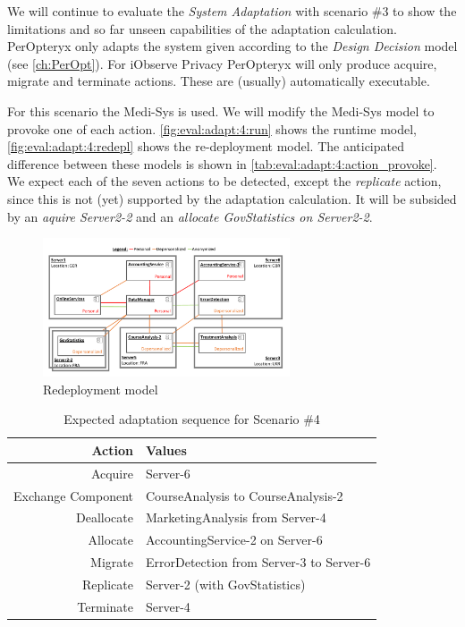 We will continue to evaluate the \textit{System Adaptation} with scenario \#3 to show the limitations and so far unseen capabilities of the adaptation calculation. PerOpteryx only adapts the system given according to the \textit{Design Decision} model (see \autoref{ch:PerOpt}). For iObserve Privacy PerOpteryx will only produce acquire, migrate and terminate actions. These are (usually) automatically executable.

For this scenario the Medi-Sys is used. We will modify the Medi-Sys model to provoke one of each action. \autoref{fig:eval:adapt:4:run} shows the runtime model, \autoref{fig:eval:adapt:4:redepl} shows the re-deployment model. The anticipated difference between these models is shown in \autoref{tab:eval:adapt:4:action_provoke}. We expect each of the seven actions to be detected, except the \textit{replicate} action, since this is not (yet) supported by the adaptation calculation. It will be subsided by an \textit{aquire Server2-2} and an \textit{allocate GovStatistics on Server2-2}.

\begin{figure}[h]
	\centering
	\includegraphics[trim = 5mm 5mm 10mm 10mm, clip, width=0.65\textwidth]{graphs/medSystem_adap_calc_all_redepl}
	\caption{Redeployment model}
	\label{fig:eval:adapt:4:redepl}
\end{figure}

\begin{table}[h]
	\centering
	\begin{tabular}{r | l }
		\hline
		\textbf{Action} & \textbf{Values}\\
		\hline
		Acquire & Server-6\\
		Exchange Component & CourseAnalysis to CourseAnalysis-2\\
		Deallocate & MarketingAnalysis from Server-4\\
		Allocate & AccountingService-2 on Server-6\\
		Migrate & ErrorDetection from Server-3 to Server-6\\
		Replicate & Server-2 (with GovStatistics)\\
		Terminate & Server-4\\
		\hline
	\end{tabular}
	\caption{Expected adaptation sequence for Scenario \#4}
	\label{tab:eval:adapt:4:action_provoke}
\end{table}

